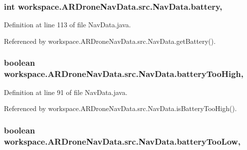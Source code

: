 \subsubsection[{battery}]{\setlength{\rightskip}{0pt plus 5cm}int workspace.\+A\+R\+Drone\+Nav\+Data.\+src.\+Nav\+Data.\+battery\hspace{0.3cm}{\ttfamily [static]}, {\ttfamily [protected]}}\label{classworkspace_1_1_a_r_drone_nav_data_1_1src_1_1_nav_data_a2d1a734f6454ccb88864805f5fb39dec}


Definition at line 113 of file Nav\+Data.\+java.



Referenced by workspace.\+A\+R\+Drone\+Nav\+Data.\+src.\+Nav\+Data.\+get\+Battery().

\hypertarget{classworkspace_1_1_a_r_drone_nav_data_1_1src_1_1_nav_data_af441e80fdf54278c8991f1039a175884}{}
\subsubsection[{battery\+Too\+High}]{\setlength{\rightskip}{0pt plus 5cm}boolean workspace.\+A\+R\+Drone\+Nav\+Data.\+src.\+Nav\+Data.\+battery\+Too\+High\hspace{0.3cm}{\ttfamily [static]}, {\ttfamily [protected]}}\label{classworkspace_1_1_a_r_drone_nav_data_1_1src_1_1_nav_data_af441e80fdf54278c8991f1039a175884}


Definition at line 91 of file Nav\+Data.\+java.



Referenced by workspace.\+A\+R\+Drone\+Nav\+Data.\+src.\+Nav\+Data.\+is\+Battery\+Too\+High().

\hypertarget{classworkspace_1_1_a_r_drone_nav_data_1_1src_1_1_nav_data_a6bcdfeddfec9eb0a3f65a8f672303d57}{}
\subsubsection[{battery\+Too\+Low}]{\setlength{\rightskip}{0pt plus 5cm}boolean workspace.\+A\+R\+Drone\+Nav\+Data.\+src.\+Nav\+Data.\+battery\+Too\+Low\hspace{0.3cm}{\ttfamily [static]}, {\ttfamily [protected]}}\label{classworkspace_1_1_a_r_drone_nav_data_1_1src_1_1_nav_data_a6bcdfeddfec9eb0a3f65a8f672303d57}



